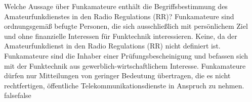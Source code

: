     {Welche Aussage über Funkamateure enthält die Begriffsbestimmung des Amateurfunkdienstes in den Radio Regulations (RR)?}
    {Funkamateure sind ordnungsgemäß befugte Personen, die sich ausschließlich mit persönlichem Ziel und ohne finanzielle Interessen für Funktechnik interessieren.}
    {Keine, da der Amateurfunkdienst in den Radio Regulations (RR) nicht definiert ist.}
    {Funkamateure sind die Inhaber einer Prüfungsbescheinigung und befassen sich mit der Funktechnik aus gewerblich-wirtschaftlichem Interesse.}
    {Funkamateure dürfen nur Mitteilungen von geringer Bedeutung übertragen, die es nicht rechtfertigen, öffentliche Telekommunikationsdienste in Anspruch zu nehmen.}
    {false}{false}